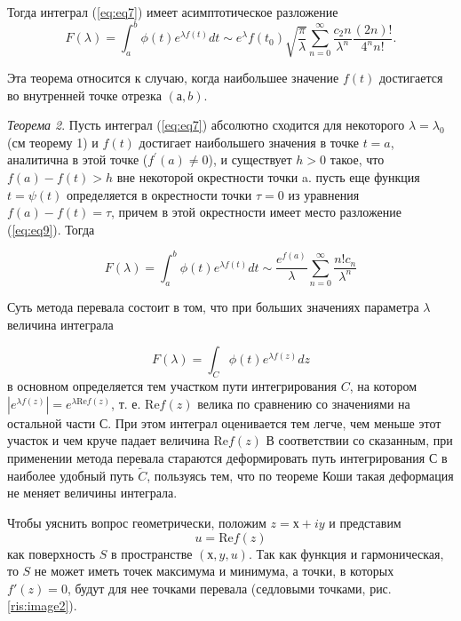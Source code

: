 \documentclass[14pt]{extarticle}
\renewcommand{\Re}{\mathrm{Re}}
\renewcommand{\Re}{\mathrm{Re}}
\begin{document}
Тогда интеграл (\ref{eq:eq7}) имеет асимптотическое разложение
$$
F(\lambda)=\int_{a}^{b}\phi(t)e^{\lambda f(t)}dt \sim e^\lambda f(t_0) \sqrt{\frac{\pi}{\lambda}} \sum_{n=0}^{\infty}\frac{c_2n}{\lambda^n}\frac{(2n)!}{4^n n!}.
$$

Эта теорема относится к случаю, когда наибольшее значение $f(t)$ достигается во внутренней точке отрезка $(а, b)$. 

\textit{Теорема 2\label{th:th2}}. Пусть интеграл (\ref{eq:eq7}) абсолютно сходится для некоторого $\lambda = \lambda_0$ (см теорему 1) и $f(t)$ достигает наибольшего значения в точке $t=a$, аналитична в этой точке ($f^\prime(a) \neq 0$), и существует $h>0$ такое, что $f(a)-f(t)>h$ вне некоторой окрестности точки a. пусть еще функция $t=\psi(t)$ определяется в окрестности точки $\tau=0$ из уравнения $f(a) - f(t) = \tau$, причем в этой окрестности имеет место разложение (\ref{eq:eq9}). Тогда

\begin{equation}\label{eq:eq10}
F(\lambda) = \int_{a}^{b}\phi(t)e^{\lambda f(t)}dt \sim \frac{e^{f(a)}}{\lambda}\sum_{n=0}^{\infty}\frac{n! c_n}{\lambda^n}
\end{equation}

Суть метода перевала состоит в том, что при больших значениях параметра $\lambda$ величина интеграла

$$
F(\lambda) = \int_{C}^{}\phi(t)e^{\lambda f(z)}dz
$$
в основном определяется тем участком пути интегрирования $C$, на котором $|e^{\lambda f(z)}|=e^{\lambda \Re f(z)}$, т. е. $\Re f(z)$ велика по сравнению со значениями на остальной части $С$. При этом интеграл оценивается тем легче, чем меньше этот участок и чем круче падает величина $\Re f(z)$ В соответствии со сказанным, при применении метода перевала стараются деформировать путь интегрирования С в наиболее удобный путь $\widetilde{C}$, пользуясь тем, что по теореме Коши такая деформация не меняет величины интеграла.\cite{Lavrentyev}

Чтобы уяснить вопрос геометрически, положим $z = х + iy$ и представим
$$
u = \Re f(z)
$$
как поверхность $S$ в пространстве $(х, y, u)$. Так как функция и гармоническая, то $S$ не может иметь точек максимума и минимума, а точки, в которых $f'(z) = 0$, будут для нее точками перевала (седловыми точками, рис. \ref{ris:image2}).

	
\end{document}
